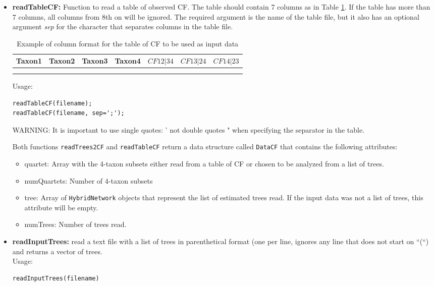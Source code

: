 \documentclass[12pt]{article}
\begin{document}
\begin{itemize}
\item \textbf{readTableCF:} Function to read a table of observed
  CF. The table should contain 7 columns as in Table \ref{tableCF}. If
  the table has more than 7 columns, all columns from 8th on will be
  ignored. The required argument is the name of the table file, but it
  also has an optional argument \textit{sep} for the character that
  separates columns in the table file.\\
\begin{table}[h]
\centering
\begin{tabular}{c|c|c|c|c|c|c}
Taxon1 & Taxon2 &Taxon3 & Taxon4 & $CF12|34$ & $CF13|24$ &  $CF14|23$\\
\hline \\
 & & & & & &
\end{tabular}
\caption{Example of column format for the table of CF to be used as
  input data}
\label{tableCF}
\end{table}

Usage:
\begin{lstlisting}
readTableCF(filename);
readTableCF(filename, sep=';');
\end{lstlisting}
WARNING: It is important to use single quotes: ' not double quotes "
when specifying the separator in the table.

Both functions \texttt{readTrees2CF} and \texttt{readTableCF} return a
data structure called \texttt{DataCF} that contains the following
attributes:
\begin{itemize}
\item{quartet: Array with the 4-taxon subsets either read from a table of CF
    or chosen to be analyzed from a list of trees.}
\item{numQuartets: Number of 4-taxon subsets}
\item{tree: Array of \texttt{HybridNetwork} objects that represent the
  list of estimated trees read. If the input data was not a list of
  trees, this attribute will be empty.}
\item{numTrees: Number of trees read.}
\end{itemize}


\item \textbf{readInputTrees:} read a text file with a list of trees
  in parenthetical format (one per line, ignores any line that does
  not start on ``(``) and
  returns a vector of trees.\\
  Usage:
\begin{lstlisting}
readInputTrees(filename)
\end{lstlisting}


\end{itemize}
\end{document}
